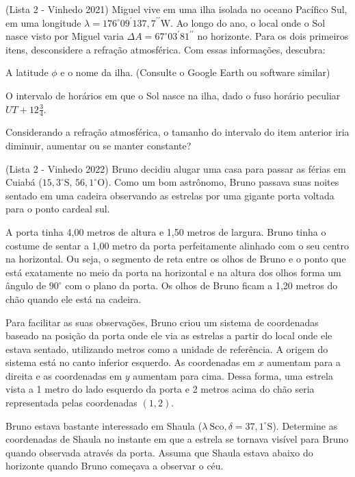 \documentclass[11pt]{article}
\begin{document}
\begin{pproblem} (Lista 2 - Vinhedo 2021)
    Miguel vive em uma ilha isolada no oceano Pacífico Sul, em uma longitude
    $\lambda = 176^{\circ}09^{\prime}137,7^{\prime\prime}\text{W}$. Ao longo do ano, o local onde o Sol nasce visto por Miguel varia $\Delta A = 67^{\circ}03^{\prime}81^{\prime\prime}$ no horizonte. Para os dois primeiros itens, desconsidere a refração atmosférica. Com essas informações, descubra:

    \begin{alternativas}
        \item A latitude $\phi$ e o nome da ilha. (Consulte o Google Earth ou software similar)
        \item O intervalo de horários em que o Sol nasce na ilha, dado o fuso horário peculiar $UT + 12\frac{3}{4}$.
        \item Considerando a refração atmosférica, o tamanho do intervalo do item anterior iria diminuir, aumentar ou se manter constante?
    \end{alternativas}

\end{pproblem}

\begin{pproblem}(Lista 2 - Vinhedo 2022) 
    Bruno decidiu alugar uma casa para passar as férias em Cuiabá ($15,3^{\circ} \text{S}$, $56,1^{\circ} \text{O}$). Como um bom astrônomo, Bruno passava suas noites sentado em uma cadeira observando as estrelas por uma gigante porta voltada para o ponto cardeal sul.

    A porta tinha 4,00 metros de altura e 1,50 metros de largura. Bruno tinha o costume de sentar a
    1,00 metro da porta perfeitamente alinhado com o seu centro na horizontal. Ou seja, o segmento
    de reta entre os olhos de Bruno e o ponto que está exatamente no meio da porta na horizontal e
    na altura dos olhos forma um ângulo de $90^{\circ}$ com o plano da porta. Os olhos de Bruno ficam a
    1,20 metros do chão quando ele está na cadeira.
    
    Para facilitar as suas observações, Bruno criou um sistema de coordenadas baseado na posição da
    porta onde ele via as estrelas a partir do local onde ele estava sentado, utilizando metros como
    a unidade de referência. A origem do sistema está no canto inferior esquerdo. As coordenadas
    em $x$ aumentam para a direita e as coordenadas em $y$ aumentam para cima. Dessa forma, uma
    estrela vista a 1 metro do lado esquerdo da porta e 2 metros acima do chão seria representada
    pelas coordenadas $(1, 2)$.
    
    Bruno estava bastante interessado em Shaula ($\lambda \ \text{Sco}, \delta = 37,1^{\circ} \text{S}$). Determine as coordenadas de
    Shaula no instante em que a estrela se tornava visível para Bruno quando observada através da
    porta. Assuma que Shaula estava abaixo do horizonte quando Bruno começava a observar o céu.
    
\end{pproblem}
\end{document}
